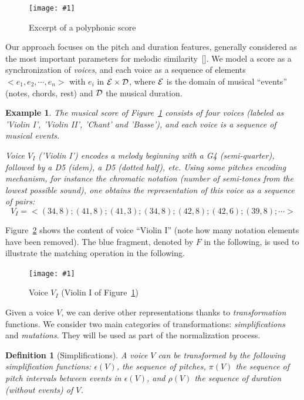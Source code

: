\documentclass[letterpaper, 11pt]{article}
\newtheorem{Definition}{Definition}
\newtheorem{Example}{Example}
\def\alphabet/{\ensuremath{{\cal E}}}
\def\durations/{\ensuremath{{\cal D}}}
\newcommand{\fig}[2]
{
\begin{figure}[ht]
 \centerline{
 \texttt{[image: \#1]}}
 \caption{\label{#1} #2}
\end{figure}
}
\newcommand{\figWithSize}[3]
{
\begin{figure}[ht]
 \centerline{
 \texttt{[image: \#1]}}
 \caption{\label{#1} #2}
\end{figure}
}
\begin{document}
\fig{incipit-44}{Excerpt of a polyphonic score}

Our approach focuses on the pitch and duration features,
generally considered as the most important parameters for melodic similarity~[\cite{Prince14}].  We model 
a score as a synchronization of \emph{voices}, and each voice as a sequence of  elements $<e_1, e_2, \cdots, e_n>$
with $e_i$ in $\alphabet/ \times \durations/$, where \alphabet/ is the domain of musical ``events'' 
(notes, chords, rest) and \durations/ the musical duration.

\begin{Example}
The musical score of Figure~\ref{incipit-44} consists of four voices
(labeled as 'Violin I', 'Violin II', 'Chant' and 'Basse'), and  each voice
is a sequence of musical events.

Voice  $V_I$ ('Violin I')  encodes a melody beginning
with a G4 (semi-quarter), followed by a D5 (idem), a D5 (dotted half), etc.
Using some pitches encoding mechanism, for instance the  chromatic notation (number
of semi-tones from the lowest possible sound), one obtains the representation
of this voice as a sequence of pairs:
$$
V_I = <(34,8);(41,8);(41,3);(34,8);(42,8);(42,6);(39,8);\cdots>
$$
\end{Example}

Figure~\ref{voice} shows the content of voice ``Violin I''
(note how many notation elements have been removed). The blue fragment,
denoted by $F$ in the following,  is used to illustrate the matching operation in the following.

\figWithSize{voice}{Voice $V_I$ (Violin I of Figure~\ref{incipit-44})}{11cm}

Given a voice $V$, we can derive other
representations thanks to \emph{transformation} functions. We consider two main categories
of transformations: \emph{simplifications} and \emph{mutations}. They will be used as part of the normalization 
process.

\begin{Definition}[Simplifications] 
A voice $V$ can be transformed by the following  simplification functions: 
$\epsilon(V)$, the sequence of pitches, $\pi(V)$ 
the sequence of pitch intervals between events in $\epsilon(V)$, and 
$\rho(V)$ the sequence of duration (without events) of $V$. 
\end{Definition}
\end{document}
